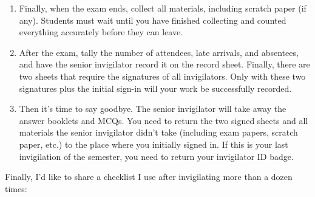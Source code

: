 \begin{enumerate}
    \item Finally, when the exam ends, collect all materials, including scratch paper (if any). Students must wait until you have finished collecting and counted everything accurately before they can leave.
    \item After the exam, tally the number of attendees, late arrivals, and absentees, and have the senior invigilator record it on the record sheet. Finally, there are two sheets that require the signatures of all invigilators. Only with these two signatures plus the initial sign-in will your work be successfully recorded.
    \item Then it's time to say goodbye. The senior invigilator will take away the answer booklets and MCQs. You need to return the two signed sheets and all materials the senior invigilator didn't take (including exam papers, scratch paper, etc.) to the place where you initially signed in. If this is your last invigilation of the semester, you need to return your invigilator ID badge.
\end{enumerate}

\emptyline{}
Finally, I'd like to share a checklist I use after invigilating more than a dozen times:

